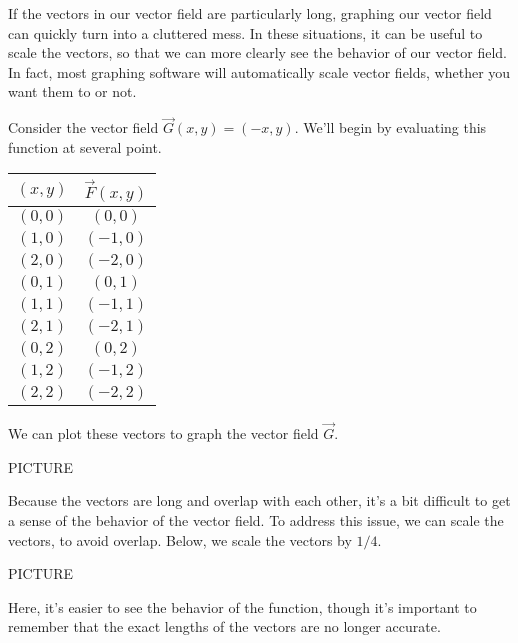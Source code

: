 \documentclass{ximera}
\begin{document}
If the vectors in our vector field are particularly long, graphing our vector field can quickly turn into a cluttered mess. In these situations, it can be useful to scale the vectors, so that we can more clearly see the behavior of our vector field. In fact, most graphing software will automatically scale vector fields, whether you want them to or not.

\begin{example}
Consider the vector field $\vec{G}(x,y) = (-x, y)$. We'll begin by evaluating this function at several point.

\begin{center}
\begin{tabular}{|c|c|}
\hline
$(x,y)$ & $\vec{F}(x,y)$\\
\hline
$(0,0)$ & $(0,0)$\\
$(1,0)$ & $(-1,0)$\\
$(2,0)$ & $(-2,0)$\\
$(0,1)$ & $(0,1)$\\
$(1,1)$ & $(-1,1)$\\
$(2,1)$ & $(-2,1)$\\
$(0,2)$ & $(0,2)$\\
$(1,2)$ & $(-1,2)$\\
$(2,2)$ & $(-2,2)$\\
\hline
\end{tabular}
\end{center}

We can plot these vectors to graph the vector field $\vec{G}$.

PICTURE

Because the vectors are long and overlap with each other, it's a bit difficult to get a sense of the behavior of the vector field. To address this issue, we can scale the vectors, to avoid overlap. Below, we scale the vectors by $1/4$.

PICTURE

Here, it's easier to see the behavior of the function, though it's important to remember that the exact lengths of the vectors are no longer accurate.

\end{example}
\end{document}
